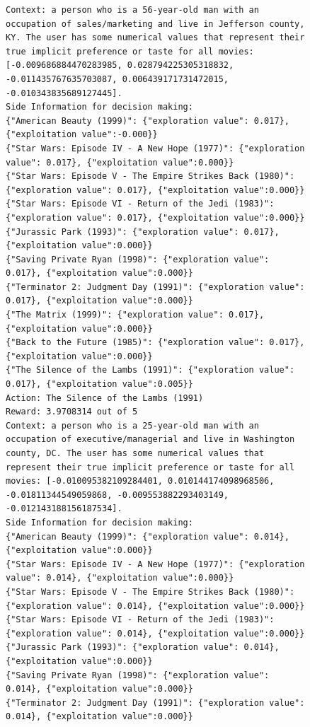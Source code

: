 \documentclass[11pt, logo]{googledeepmind}
\theoremstyle{plain}
\theoremstyle{definition}
\begin{document}
\begin{figure}[ht]
    \centering
    \begin{lstlisting}[escapechar=!]
Context: a person who is a 56-year-old man with an occupation of sales/marketing and live in Jefferson county, KY. The user has some numerical values that represent their true implicit preference or taste for all movies: [-0.009686884470283985, 0.028794225305318832, -0.011435767635703087, 0.006439171731472015, -0.010343835689127445].
Side Information for decision making:
{"American Beauty (1999)": {"exploration value": 0.017}, {"exploitation value":-0.000}}
{"Star Wars: Episode IV - A New Hope (1977)": {"exploration value": 0.017}, {"exploitation value":0.000}}
{"Star Wars: Episode V - The Empire Strikes Back (1980)": {"exploration value": 0.017}, {"exploitation value":0.000}}
{"Star Wars: Episode VI - Return of the Jedi (1983)": {"exploration value": 0.017}, {"exploitation value":0.000}}
{"Jurassic Park (1993)": {"exploration value": 0.017}, {"exploitation value":0.000}}
{"Saving Private Ryan (1998)": {"exploration value": 0.017}, {"exploitation value":0.000}}
{"Terminator 2: Judgment Day (1991)": {"exploration value": 0.017}, {"exploitation value":0.000}}
{"The Matrix (1999)": {"exploration value": 0.017}, {"exploitation value":0.000}}
{"Back to the Future (1985)": {"exploration value": 0.017}, {"exploitation value":0.000}}
{"The Silence of the Lambs (1991)": {"exploration value": 0.017}, {"exploitation value":0.005}}
Action: The Silence of the Lambs (1991)
Reward: 3.9708314 out of 5
Context: a person who is a 25-year-old man with an occupation of executive/managerial and live in Washington county, DC. The user has some numerical values that represent their true implicit preference or taste for all movies: [-0.010095382109284401, 0.010144174098968506, -0.01811344549059868, -0.009553882293403149, -0.012143188156187534].
Side Information for decision making:
{"American Beauty (1999)": {"exploration value": 0.014}, {"exploitation value":0.000}}
{"Star Wars: Episode IV - A New Hope (1977)": {"exploration value": 0.014}, {"exploitation value":0.000}}
{"Star Wars: Episode V - The Empire Strikes Back (1980)": {"exploration value": 0.014}, {"exploitation value":0.000}}
{"Star Wars: Episode VI - Return of the Jedi (1983)": {"exploration value": 0.014}, {"exploitation value":0.000}}
{"Jurassic Park (1993)": {"exploration value": 0.014}, {"exploitation value":0.000}}
{"Saving Private Ryan (1998)": {"exploration value": 0.014}, {"exploitation value":0.000}}
{"Terminator 2: Judgment Day (1991)": {"exploration value": 0.014}, {"exploitation value":0.000}}

\end{lstlisting}
\end{figure}
\end{document}
